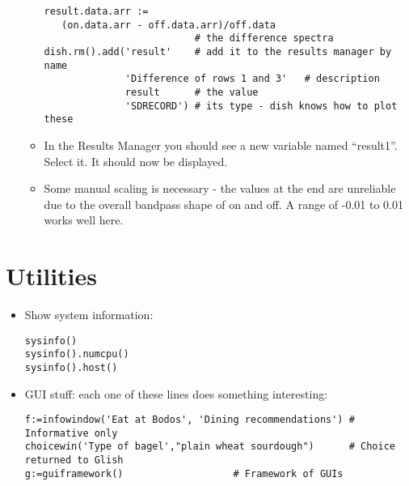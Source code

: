 \begin{itemize}
\begin{itemize}
\begin{verbatim}
result.data.arr :=
   (on.data.arr - off.data.arr)/off.data
                          # the difference spectra
dish.rm().add('result'    # add it to the results manager by name
              'Difference of rows 1 and 3'   # description
              result      # the value
              'SDRECORD') # its type - dish knows how to plot these
\end{verbatim}
\item In the Results Manager you should see a new variable named
``result1''.  Select it.  It should now be displayed.
\item Some manual scaling is necessary - the values at the end are
unreliable due to the overall bandpass shape of on and off.
A range of -0.01 to 0.01 works well here.
\end{itemize}
\end{itemize}

\section{Utilities}

\begin{itemize}
\item Show system information:
\begin{verbatim}
sysinfo()
sysinfo().numcpu()
sysinfo().host()
\end{verbatim}
\item GUI stuff: each one of these lines does something interesting:
\begin{verbatim}
f:=infowindow('Eat at Bodos', 'Dining recommendations') # Informative only
choicewin('Type of bagel',"plain wheat sourdough")      # Choice returned to Glish
g:=guiframework()					# Framework of GUIs
\end{verbatim}
\end{itemize}

